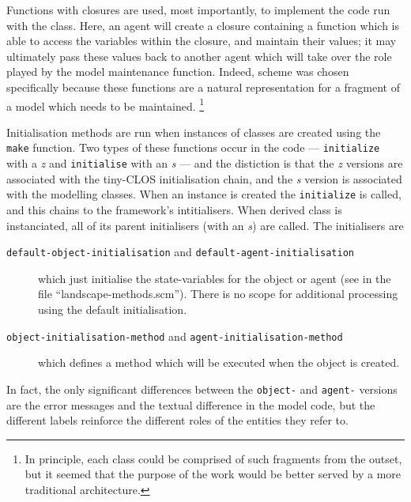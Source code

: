 Functions with closures are used, most importantly, to implement the
code run with the  class. Here, an agent will
create a closure containing a function which is able to access the
variables within the closure, and maintain their values; it may
ultimately pass these values back to another agent which will take
over the role played by the model maintenance function.  Indeed,
scheme was chosen specifically because these functions are a natural
representation for a fragment of a model which needs to be
maintained. \footnote{In principle, each class could be comprised of such
fragments from the outset, but it seemed that the purpose of the
work would be better served by a more traditional architecture.}

Initialisation methods are run when instances of classes are created
using the \texttt{make} function.  Two types of these functions occur
in the code --- \texttt{initialize} with a \emph{z} and
\texttt{initialise} with an \emph{s} --- and the distiction is that
the \emph{z} versions are associated with the tiny-CLOS initialisation
chain, and the \emph{s} version is associated with the modelling
classes. When an instance is created the 
\texttt{initialize} is called, and this chains to the framework's
intitialisers.  When  derived class is instanciated, all of
its parent initialisers (with an \emph{s}) are called.  The
initialisers are
\begin{description}
  \item[\texttt{default-object-initialisation} and
    \texttt{default-agent-initialisation}] which just initialise the
    state-variables for the object or agent (see  in the
    file ``landscape-methods.scm''). There is no scope for additional
    processing using the default initialisation.
  \item[\texttt{object-initialisation-method} and
    \texttt{agent-initialisation-method}] which defines a method which
    will be executed when the object is created.
\end{description}
In fact, the only significant differences between the \texttt{object-}
and \texttt{agent-} versions are the error messages and the textual
difference in the model code, but the different labels reinforce the
different roles of the entities they refer to.
    

